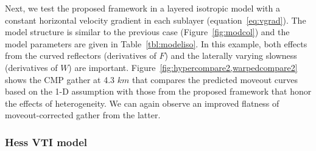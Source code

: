 \begin{table*}
\caption{Model parameters for the layered isotropic model. The reference velocity at 3 $km$ and horizontal velocity gradient.}
\label{tbl:modeliso}
    \centering
\end{table*}



Next, we test the proposed framework in a layered isotropic model with a constant horizontal velocity gradient in each sublayer (equation~\ref{eq:vgrad}). The model structure is similar to the previous case (Figure~\ref{fig:modcol}) and the model parameters are given in Table~\ref{tbl:modeliso}. In this example, both effects from the curved reflectors (derivatives of $F$) and the laterally varying slowness (derivatives of $W$) are important. Figure~\ref{fig:hypercompare2,warpedcompare2} shows the CMP gather at 4.3 $km$ that compares the predicted moveout curves based on the 1-D assumption with those from the proposed framework that honor the effects of heterogeneity. We can again observe an improved flatness of moveout-corrected gather from the latter.

\subsubsection{Hess VTI model}


